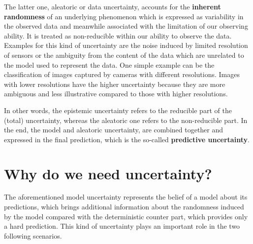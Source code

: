 The latter one, aleatoric or data uncertainty, accounts for the \textbf{inherent randomness} of an underlying phenomenon which is expressed as variability in the observed data and meanwhile associated with the limitation of our observing ability. It is treated as non-reducible within our ability to observe the data. Examples for this kind of uncertainty are the noise induced by limited resolution of sensors or the ambiguity from the content of the data which are unrelated to the model used to represent the data. One simple example can be the classification of images captured by cameras with different resolutions. Images with lower resolutions have the higher uncertainty because they are more ambiguous and less illustrative compared to those with higher resolutions. 

In other words, the epistemic uncertainty refers to the reducible part of the (total) uncertainty, whereas the aleatoric one refers to the non-reducible part. In the end, the model and aleatoric uncertainty, are combined together and expressed in the final prediction, which is the so-called \textbf{predictive uncertainty}.

\section{Why do we need uncertainty?}
The aforementioned model uncertainty represents the belief of a model about its predictions, which brings additional information about the randomness induced by the model compared with the deterministic counter part, which provides only a hard prediction. This kind of uncertainty plays an important role in the two following scenarios. 

